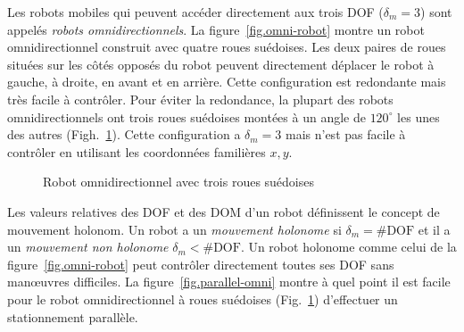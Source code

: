 Les robots mobiles qui peuvent accéder directement aux trois DOF ($\delta_m=3$) sont appelés \emph{robots omnidirectionnels}\label{robot omnidirectionnel}. La figure~\ref{fig.omni-robot} montre un robot omnidirectionnel construit avec quatre roues suédoises. Les deux paires de roues situées sur les côtés opposés du robot peuvent directement déplacer le robot à gauche, à droite, en avant et en arrière. Cette configuration est redondante mais très facile à contrôler. Pour éviter la redondance, la plupart des robots omnidirectionnels ont trois roues suédoises montées à un angle de $120^\circ$ les unes des autres (Figh.~\ref{fig.omni3}). Cette configuration a $\delta_m=3$ mais n'est pas facile à contrôler en utilisant les coordonnées familières $x,y$.

\begin{figure}
\begin{center}
\end{center}
\caption{Robot omnidirectionnel avec trois roues suédoises}\label{fig.omni3}
\end{figure}

Les valeurs relatives des DOF et des DOM d'un robot définissent le concept de mouvement holonom. Un robot a un \emph{mouvement holonome} si $\delta_m = \#\textrm{DOF}$ et il a un \emph{mouvement non holonome} $\delta_m < \#\textrm{DOF}$. Un robot holonome comme celui de la figure~\ref{fig.omni-robot} peut contrôler directement toutes ses DOF sans manœuvres difficiles. La figure~\ref{fig.parallel-omni} montre à quel point il est facile pour le robot omnidirectionnel à roues suédoises (Fig.~\ref{fig.omni3}) d'effectuer un stationnement parallèle.

